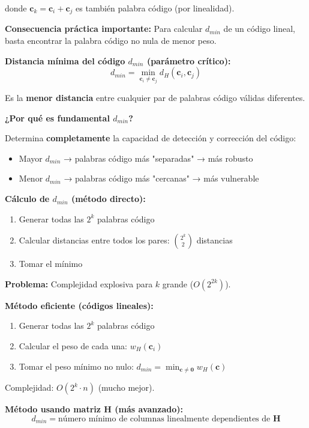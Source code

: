 \documentclass[10pt,a4paper]{article}
\begin{document}
donde $\mathbf{c}_k = \mathbf{c}_i + \mathbf{c}_j$ es también palabra código (por linealidad).

\textbf{Consecuencia práctica importante:} Para calcular $d_{min}$ de un código lineal, basta encontrar la palabra código no nula de menor peso.

\textbf{Distancia mínima del código $d_{min}$ (parámetro crítico):}
$$\boxed{d_{min} = \min_{\mathbf{c}_i \neq \mathbf{c}_j} d_H(\mathbf{c}_i, \mathbf{c}_j)}$$

Es la \textbf{menor distancia} entre cualquier par de palabras código válidas diferentes.

\textbf{¿Por qué es fundamental $d_{min}$?}

Determina \textbf{completamente} la capacidad de detección y corrección del código:
\begin{itemize}
\item Mayor $d_{min}$ → palabras código más "separadas" → más robusto
\item Menor $d_{min}$ → palabras código más "cercanas" → más vulnerable
\end{itemize}

\textbf{Cálculo de $d_{min}$ (método directo):}
\begin{enumerate}
\item Generar todas las $2^k$ palabras código
\item Calcular distancias entre todos los pares: $\binom{2^k}{2}$ distancias
\item Tomar el mínimo
\end{enumerate}

\textbf{Problema:} Complejidad explosiva para $k$ grande ($O(2^{2k})$).

\textbf{Método eficiente (códigos lineales):}
\begin{enumerate}
\item Generar todas las $2^k$ palabras código
\item Calcular el peso de cada una: $w_H(\mathbf{c}_i)$
\item Tomar el peso mínimo no nulo: $d_{min} = \min_{\mathbf{c} \neq \mathbf{0}} w_H(\mathbf{c})$
\end{enumerate}

Complejidad: $O(2^k \cdot n)$ (mucho mejor).

\textbf{Método usando matriz $\mathbf{H}$ (más avanzado):}
$$d_{min} = \text{número mínimo de columnas linealmente dependientes de } \mathbf{H}$$
\end{document}
